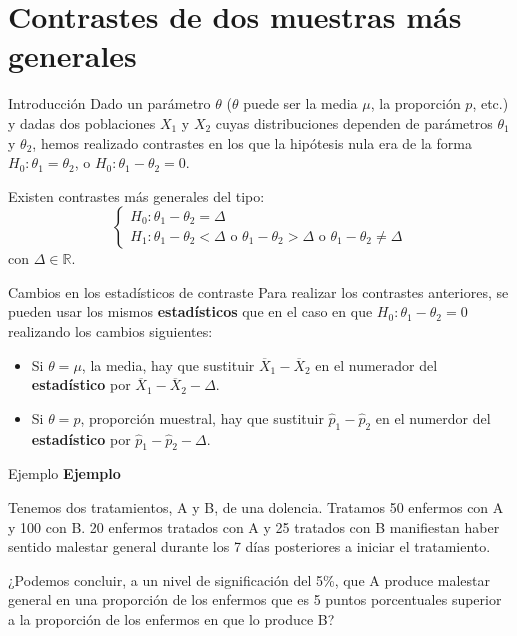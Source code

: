 \documentclass[
  ignorenonframetext,
]{beamer}
\begin{document}
\hypertarget{contrastes-de-dos-muestras-muxe1s-generales}{%
\section{Contrastes de dos muestras más
generales}\label{contrastes-de-dos-muestras-muxe1s-generales}}

\begin{frame}{Introducción}
\protect\hypertarget{introducciuxf3n-3}{}
Dado un parámetro \(\theta\) (\(\theta\) puede ser la media \(\mu\), la
proporción \(p\), etc.) y dadas dos poblaciones \(X_1\) y \(X_2\) cuyas
distribuciones dependen de parámetros \(\theta_1\) y \(\theta_2\), hemos
realizado contrastes en los que la hipótesis nula era de la forma
\(H_0:\theta_1 = \theta_2\), o \(H_0:\theta_1 - \theta_2=0\).

Existen contrastes más generales del tipo: \[
\left\{\begin{array}{l}
H_0:\theta_1-\theta_2=\Delta\\
H_1:\theta_1-\theta_2<\Delta\mbox{ o }\theta_1-\theta_2>\Delta\mbox{ o }\theta_1-\theta_2\neq\Delta
\end{array}\right.
\] con \(\Delta\in \mathbb{R}\).
\end{frame}

\begin{frame}{Cambios en los estadísticos de contraste}
\protect\hypertarget{cambios-en-los-estaduxedsticos-de-contraste}{}
Para realizar los contrastes anteriores, se pueden usar los mismos
\textbf{estadísticos} que en el caso en que
\(H_0:\theta_1 - \theta_2=0\) realizando los cambios siguientes:

\begin{itemize}[<+->]
\item
  Si \(\theta =\mu\), la media, hay que sustituir
  \(\overline{X}_1-\overline{X}_2\) en el numerador del
  \textbf{estadístico} por \(\overline{X}_1-\overline{X}_2-\Delta\).
\item
  Si \(\theta =p\), proporción muestral, hay que sustituir
  \(\widehat{p}_1-\widehat{p}_2\) en el numerdor del
  \textbf{estadístico} por \(\widehat{p}_1-\widehat{p}_2-\Delta\).
\end{itemize}
\end{frame}

\begin{frame}{Ejemplo}
\protect\hypertarget{ejemplo-44}{}
\textbf{Ejemplo}

Tenemos dos tratamientos, A y B, de una dolencia. Tratamos 50 enfermos
con A y 100 con B. 20 enfermos tratados con A y 25 tratados con B
manifiestan haber sentido malestar general durante los 7 días
posteriores a iniciar el tratamiento.

¿Podemos concluir, a un nivel de significación del 5\%, que A produce
malestar general en una proporción de los enfermos que es 5 puntos
porcentuales superior a la proporción de los enfermos en que lo produce
B?
\end{frame}
\end{document}

